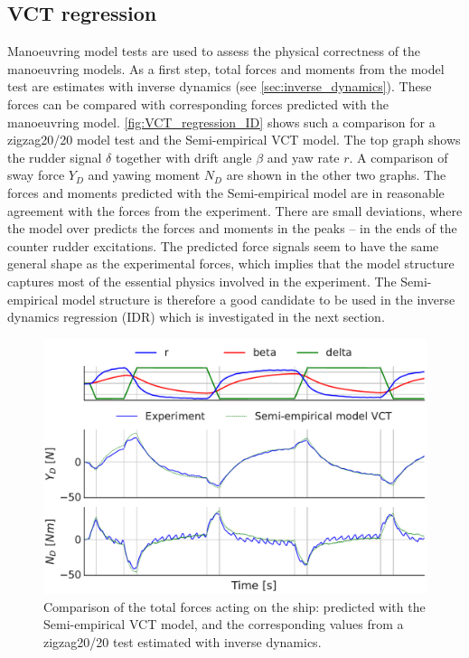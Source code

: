 \subsection{VCT regression}
\label{sec:result_VCT_regression}
Manoeuvring model tests are used to assess the physical correctness of the manoeuvring models. As a first step, total forces and moments from the model test are estimates with inverse dynamics (see \autoref{sec:inverse_dynamics}). These forces can be compared with corresponding forces predicted with the manoeuvring model. 
\autoref{fig:VCT_regression_ID} shows such a comparison for a zigzag20/20 model test and the Semi-empirical VCT model. The top graph shows the rudder signal $\delta$ together with drift angle $\beta$ and yaw rate $r$. A comparison of sway force $Y_D$ and yawing moment $N_D$ are shown in the other two graphs. The forces and moments predicted with the Semi-empirical model are in reasonable agreement with the forces from the experiment. There are small deviations, where the model over predicts the forces and moments in the peaks -- in the ends of the counter rudder excitations. The predicted force signals seem to have the same general shape as the experimental forces, which implies that the model structure captures most of the essential physics involved in the experiment. The Semi-empirical model structure is therefore a good candidate to be used in the inverse dynamics regression (IDR) which is investigated in the next section.
\begin{figure}[h!]
    \includegraphics[width=\columnwidth]{figures/result_VCT_regression.VCT_regression_ID.pdf}
    \caption{Comparison of the total forces acting on the ship: predicted with the Semi-empirical VCT model, and the corresponding values from a zigzag20/20 test estimated with inverse dynamics.}
    \label{fig:VCT_regression_ID}
\end{figure}
